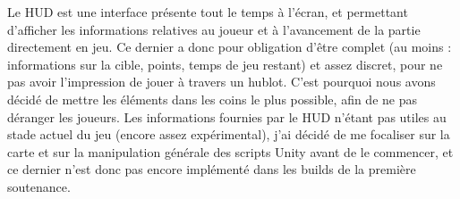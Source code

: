 \documentclass[../doc.tex]{subfiles}
\begin{document}
Le HUD est une interface présente tout le temps à l'écran, et permettant d'afficher 
les informations relatives au joueur et à l'avancement de la partie directement en jeu. 
Ce dernier a donc pour obligation d'être complet (au moins : informations sur la cible,
points, temps de jeu restant) et assez discret, pour ne pas avoir l'impression 
de jouer à travers un hublot. C'est pourquoi nous avons décidé de mettre les 
éléments dans les coins le plus possible, afin de ne pas déranger les joueurs.
Les informations fournies par le HUD n'étant pas utiles au stade actuel du jeu 
(encore assez expérimental), j'ai décidé de me focaliser sur la carte et sur la manipulation
générale des scripts Unity avant de le commencer, et ce dernier n'est donc pas 
encore implémenté dans les builds de la première soutenance.
\end{document}
